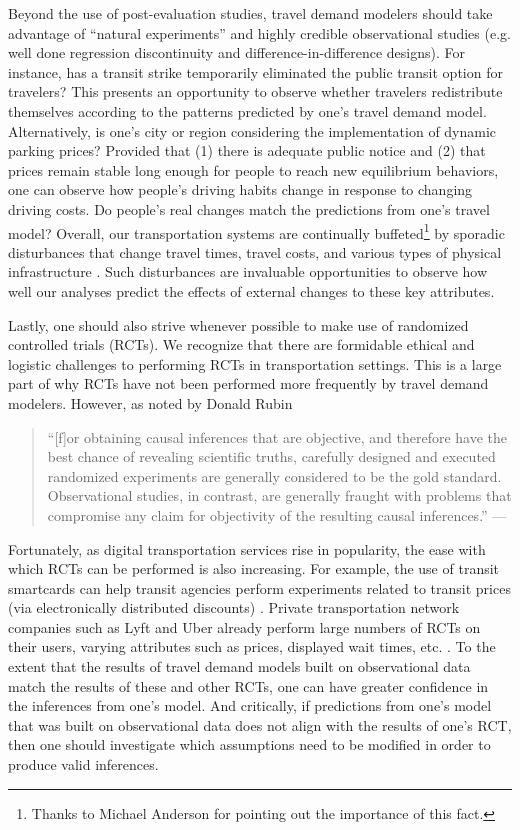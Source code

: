 Beyond the use of post-evaluation studies, travel demand modelers should take advantage of ``natural experiments'' and highly credible observational studies (e.g. well done regression discontinuity and difference-in-difference designs). For instance, has a transit strike temporarily eliminated the public transit option for travelers? This presents an opportunity to observe whether travelers redistribute themselves according to the patterns predicted by one's travel demand model. Alternatively, is one's city or region considering the implementation of dynamic parking prices? Provided that (1) there is adequate public notice and (2) that prices remain stable long enough for people to reach new equilibrium behaviors, one can observe how people's driving habits change in response to changing driving costs. Do people's real changes match the predictions from one's travel model? Overall, our transportation systems are continually buffeted\footnote{Thanks to Michael Anderson for pointing out the importance of this fact.} by sporadic disturbances that change travel times, travel costs, and various types of physical infrastructure \citep[e.g.][]{marsden_2013_insights}. Such disturbances are invaluable opportunities to observe how well our analyses predict the effects of external changes to these key attributes.

Lastly, one should also strive whenever possible to make use of randomized controlled trials (RCTs). We recognize that there are formidable ethical and logistic challenges to performing RCTs in transportation settings. This is a large part of why RCTs have not been performed more frequently by travel demand modelers. However, as noted by Donald Rubin
\begin{quotation}
``[f]or obtaining causal inferences that are objective, and therefore have the best chance of revealing scientific truths, carefully designed and executed randomized experiments are generally considered to be the gold standard. Observational studies, in contrast, are generally fraught with problems that compromise any claim for objectivity of the resulting causal inferences.'' ---\citep{rubin2008objective}
\end{quotation}
Fortunately, as digital transportation services rise in popularity, the ease with which RCTs can be performed is also increasing. For example, the use of transit smartcards can help transit agencies perform experiments related to transit prices (via electronically distributed discounts) \citep{carrel_2017_san}. Private transportation network companies such as Lyft and Uber already perform large numbers of RCTs on their users, varying attributes such as prices, displayed wait times, etc. \citep{chamandy_2016_experimentation, attwell_2017_engineering}. To the extent that the results of travel demand models built on observational data match the results of these and other RCTs, one can have greater confidence in the inferences from one's model. And critically, if predictions from one's model that was built on observational data does not align with the results of one's RCT, then one should investigate which assumptions need to be modified in order to produce valid inferences.

